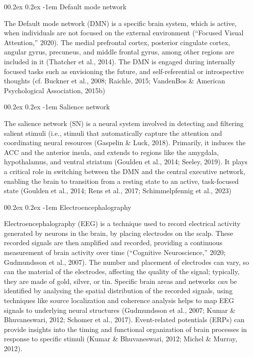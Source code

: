 \documentclass[
  stu, a4paper, 12pt,mask,floatsintext]{apa7}
\makeatletter
\let\oldparagraph\paragraph
\renewcommand{\paragraph}[1]{\oldparagraph{#1}\mbox{}}
\renewcommand{\paragraph}{\@startsection{paragraph}{4}{\parindent}%
  {0\baselineskip \@plus 0.2ex \@minus 0.2ex}%
  {-1em}%
  {\normalfont\normalsize\bfseries\itshape\typesectitle}}
\renewcommand{\paragraph}{\@startsection{paragraph}{4}{\parindent}%
  {0\baselineskip \@plus 0.2ex \@minus 0.2ex}%
  {-1em}%
  {\normalfont\normalsize\bfseries\typesectitle}}
\makeatother
\begin{document}
\paragraph{Default mode network}\label{default-mode-network}

The Default mode network (DMN) is a specific brain system, which is active, when individuals are not focused on the external environment ({``Focused Visual Attention,''} 2020).
The medial prefrontal cortex, posterior cingulate cortex, angular gyrus, precuneus, and middle frontal gyrus, among other regions are included in it (Thatcher et al., 2014).
The DMN is engaged during internally focused tasks such as envisioning the future, and self-referential or introspective thoughts (cf. Buckner et al., 2008; Raichle, 2015; VandenBos \& American Psychological Association, 2015b)

\paragraph{Salience network}\label{salience-network}

The salience network (SN) is a neural system involved in detecting and filtering salient stimuli (i.e., stimuli that automatically capture the attention and coordinating neural resources (Gaspelin \& Luck, 2018).
Primarily, it induces the ACC and the anterior insula, and extends to regions like the amygdala, hypothalamus, and ventral striatum (Goulden et al., 2014; Seeley, 2019).
It plays a critical role in switching between the DMN and the central executive network, enabling the brain to transition from a resting state to an active, task-focused state (Goulden et al., 2014; Rens et al., 2017; Schimmelpfennig et al., 2023)

\paragraph{Electroencephalography}\label{electroencephalography}

Electroencephalography (EEG) is a technique used to record electrical activity generated by neurons in the brain, by placing electrodes on the scalp.
These recorded signals are then amplified and recorded, providing a continuous measurement of brain activity over time ({``Cognitive Neuroscience,''} 2020; Gudmundsson et al., 2007).
The number and placement of electrodes can vary, so can the material of the electrodes, affecting the quality of the signal; typically, they are made of gold, silver, or tin.
Specific brain areas and networks \emph{can} be identified by analysing the spatial distribution of the recorded signals, using techniques like source localization and coherence analysis helps to map EEG signals to underlying neural structures (Gudmundsson et al., 2007; Kumar \& Bhuvaneswari, 2012; Schomer et al., 2017).
Event-related potentials (ERPs) can provide insights into the timing and functional organization of brain processes in response to specific stimuli (Kumar \& Bhuvaneswari, 2012; Michel \& Murray, 2012).
\end{document}
